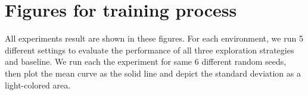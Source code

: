 \section{Figures for training process}
All experiments result are shown in these figures. For each environment, we run 5 different settings to evaluate the performance of all three exploration strategies and baseline. We run each the experiment for same 6 different random seeds, then plot the mean curve as the solid line and depict the standard deviation as a light-colored area.
\label{apdx:allfigure}
\begin{figure}[htb]
   \centering

\end{figure}
